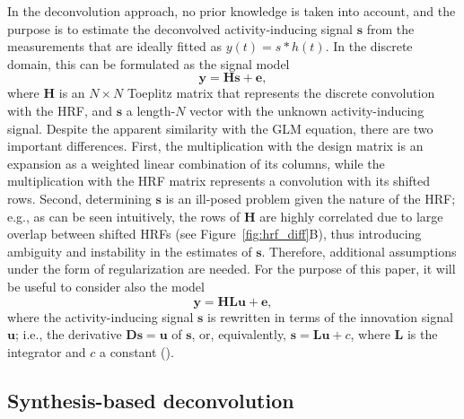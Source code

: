 In the deconvolution approach, no prior knowledge is taken into account, and the purpose is to estimate the deconvolved activity-inducing signal $\mathbf{s}$ from the measurements that are ideally fitted as $y(t) = s*h(t)$. In the discrete domain, this can be formulated as the signal model
\begin{equation}
    \label{eq:deconvolution}
    \mathbf{y} = \mathbf{Hs} + \mathbf{e},
\end{equation}
where $\mathbf{H}$ is an $N\times N$ Toeplitz matrix that represents the discrete convolution with the HRF, and $\mathbf{s}$ a length-$N$ vector with the unknown activity-inducing signal. Despite the apparent similarity with the GLM equation, there are two important differences. First, the multiplication with the design matrix is an expansion as a weighted linear combination of its columns, while the multiplication with the HRF matrix represents a convolution with its shifted rows. Second, determining $\mathbf{s}$ is an ill-posed problem given the nature of the HRF; e.g., as can be seen intuitively, the rows of $\mathbf{H}$ are highly correlated due to large overlap between shifted HRFs (see Figure~\ref{fig:hrf_diff}B), thus introducing ambiguity and instability in the estimates of $\mathbf{s}$. Therefore, additional assumptions under the form of regularization are needed. For the purpose of this paper, it will be useful to consider also the model
$$
\mathbf{y} = \mathbf{H L u} + \mathbf{e},
$$
where the activity-inducing signal $\mathbf{s}$ is rewritten in terms of the innovation signal $\mathbf{u}$; i.e., the derivative $\mathbf{Ds}=\mathbf{u}$ of $\mathbf{s}$, or, equivalently, $\mathbf{s}=\mathbf{Lu}+c$, where $\mathbf{L}$ is the integrator and $c$ a constant (\citealt{cherkaoui2019SparsitybasedBlindDeconvolution,urunuela2020StabilityBasedSparseParadigm}). 


\subsection{Synthesis-based deconvolution}

